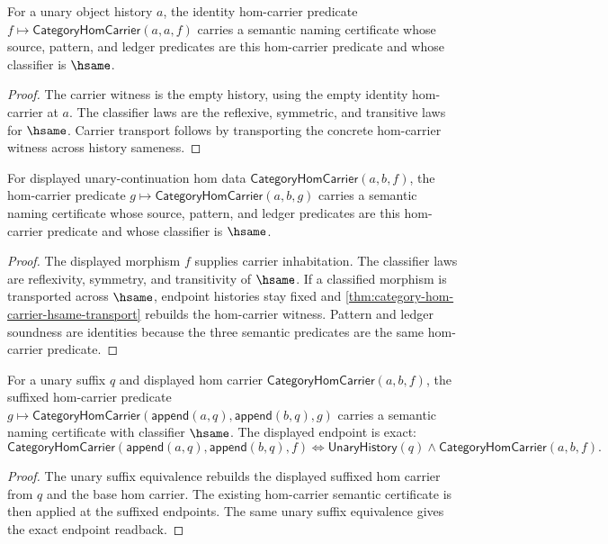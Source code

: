 \begin{theorem}
\label{thm:category-hom-carrier-identity-semantic-namecert}
For a unary object history $a$, the identity hom-carrier predicate
$f\mapsto\mathsf{CategoryHomCarrier}(a,a,f)$ carries a semantic naming
certificate whose source, pattern, and ledger predicates are this hom-carrier
predicate and whose classifier is $\hsame$.
\end{theorem}
\begin{proof}
The carrier witness is the empty history, using the empty identity hom-carrier
at $a$. The classifier laws are the reflexive, symmetric, and transitive laws
for $\hsame$. Carrier transport follows by transporting the concrete
hom-carrier witness across history sameness.
\end{proof}

\begin{theorem}
\label{thm:category-hom-carrier-semantic-namecert-of-hom}
For displayed unary-continuation hom data
$\mathsf{CategoryHomCarrier}(a,b,f)$, the hom-carrier predicate
$g\mapsto\mathsf{CategoryHomCarrier}(a,b,g)$ carries a semantic naming
certificate whose source, pattern, and ledger predicates are this hom-carrier
predicate and whose classifier is $\hsame$.
\end{theorem}
\begin{proof}
The displayed morphism $f$ supplies carrier inhabitation. The classifier laws
are reflexivity, symmetry, and transitivity of $\hsame$. If a classified
morphism is transported across $\hsame$, endpoint histories stay fixed and
\autoref{thm:category-hom-carrier-hsame-transport} rebuilds the
hom-carrier witness. Pattern and ledger soundness are identities because the
three semantic predicates are the same hom-carrier predicate.
\end{proof}

\begin{theorem}
\label{thm:category-hom-carrier-unary-suffix-semantic-boundary}
For a unary suffix $q$ and displayed hom carrier
$\mathsf{CategoryHomCarrier}(a,b,f)$, the suffixed hom-carrier predicate
$g\mapsto\mathsf{CategoryHomCarrier}(\mathsf{append}(a,q),\mathsf{append}(b,q),g)$
carries a semantic naming certificate with classifier $\hsame$. The displayed
endpoint is exact:
$$
\mathsf{CategoryHomCarrier}(\mathsf{append}(a,q),\mathsf{append}(b,q),f)
\Longleftrightarrow
\mathsf{UnaryHistory}(q)\land\mathsf{CategoryHomCarrier}(a,b,f).
$$
\end{theorem}
\begin{proof}
The unary suffix equivalence rebuilds the displayed suffixed hom carrier from
$q$ and the base hom carrier. The existing hom-carrier semantic certificate is
then applied at the suffixed endpoints. The same unary suffix equivalence gives
the exact endpoint readback.
\end{proof}

